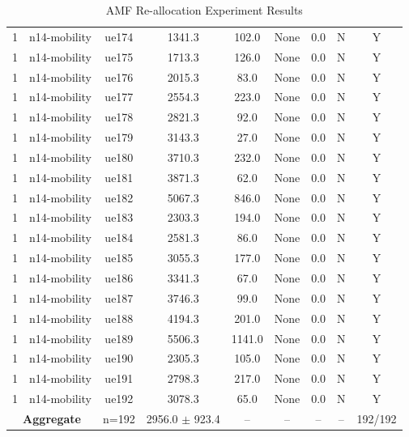 \begin{table}[ht]
\begin{tabular}{|c|c|c|c|c|c|c|c|c|}
1 & n14-mobility & ue174 & 1341.3 & 102.0 & None & 0.0 & N & Y \\
1 & n14-mobility & ue175 & 1713.3 & 126.0 & None & 0.0 & N & Y \\
1 & n14-mobility & ue176 & 2015.3 & 83.0 & None & 0.0 & N & Y \\
1 & n14-mobility & ue177 & 2554.3 & 223.0 & None & 0.0 & N & Y \\
1 & n14-mobility & ue178 & 2821.3 & 92.0 & None & 0.0 & N & Y \\
1 & n14-mobility & ue179 & 3143.3 & 27.0 & None & 0.0 & N & Y \\
1 & n14-mobility & ue180 & 3710.3 & 232.0 & None & 0.0 & N & Y \\
1 & n14-mobility & ue181 & 3871.3 & 62.0 & None & 0.0 & N & Y \\
1 & n14-mobility & ue182 & 5067.3 & 846.0 & None & 0.0 & N & Y \\
1 & n14-mobility & ue183 & 2303.3 & 194.0 & None & 0.0 & N & Y \\
1 & n14-mobility & ue184 & 2581.3 & 86.0 & None & 0.0 & N & Y \\
1 & n14-mobility & ue185 & 3055.3 & 177.0 & None & 0.0 & N & Y \\
1 & n14-mobility & ue186 & 3341.3 & 67.0 & None & 0.0 & N & Y \\
1 & n14-mobility & ue187 & 3746.3 & 99.0 & None & 0.0 & N & Y \\
1 & n14-mobility & ue188 & 4194.3 & 201.0 & None & 0.0 & N & Y \\
1 & n14-mobility & ue189 & 5506.3 & 1141.0 & None & 0.0 & N & Y \\
1 & n14-mobility & ue190 & 2305.3 & 105.0 & None & 0.0 & N & Y \\
1 & n14-mobility & ue191 & 2798.3 & 217.0 & None & 0.0 & N & Y \\
1 & n14-mobility & ue192 & 3078.3 & 65.0 & None & 0.0 & N & Y \\
\multicolumn{2}{|c|}{\textbf{Aggregate}} & n=192 & 2956.0 $\pm$ 923.4 & -- & -- & -- & -- & 192/192 \\
\hline
\end{tabular}
\caption{AMF Re-allocation Experiment Results}
\label{tab:amf_realloc}
\end{table}
